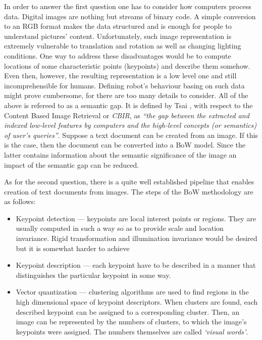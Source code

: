 \documentclass[a4paper,12pt]{article}
\begin{document}
  In order to answer the first question one has to consider how computers process data. Digital images are nothing but streams of binary code. A simple conversion to an RGB format makes the data structured and is enough for people to understand pictures' content. Unfortunately, such image representation is extremely vulnerable to translation and rotation as well as changing lighting conditions. One way to address these disadvantages would be to compute locations of some characteristic points (keypoints) and describe them somehow. Even then, however, the resulting representation is a low level one and still incomprehensible for humans. Defining robot's behaviour basing on such data might prove cumbersome, for there are too many details to consider. All of the above is refereed to as a semantic gap. It is defined by Tsai \cite{tsai2012bag}, with respect to the Content Based Image Retrieval or \textit{CBIR}, as \emph{``the gap between the extracted and indexed low-level features by computers and the high-level concepts (or semantics) of user’s queries''}. Suppose a text document can be created from an image. If this is the case, then the document can be converted into a BoW model. Since the latter contains information about the semantic significance of the image an impact of the semantic gap can be reduced.
  
  As for the second question, there is a quite well established pipeline that enables creation of text documents from images. The steps of the BoW methodology are as follows:
  \begin{itemize}
   \item Keypoint detection --- keypoints are local interest points or regions. They are usually computed in such a way so as to provide scale and location invariance. Rigid transformation and illumination invariance would be desired but it is somewhat harder to achieve
   \item Keypoint description --- each keypoint have to be described in a manner that distinguishes the particular keypoint in some way.
   \item Vector quantization --- clustering algorithms are used to find regions in the high dimensional space of keypoint descriptors. When clusters are found, each described keypoint can be assigned to a corresponding cluster. Then, an image can be represented by the numbers of clusters, to which the image's keypoints were assigned. The numbers themselves are called \emph{`visual words'}.
  \end{itemize}
  
\end{document}
